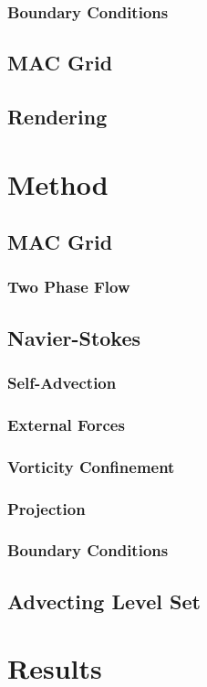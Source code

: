 \documentclass[]{report}   %
\begin{document}
\subsection{Boundary Conditions}

\section{MAC Grid}

\section{Rendering}


\chapter{Method}
\section{MAC Grid}

\subsection{Two Phase Flow}

\section{Navier-Stokes}
\subsection{Self-Advection}

\subsection{External Forces}

\subsection{Vorticity Confinement}

\subsection{Projection}

\subsection{Boundary Conditions}

\section{Advecting Level Set}


\chapter{Results}



\endgroup



\end{document}
